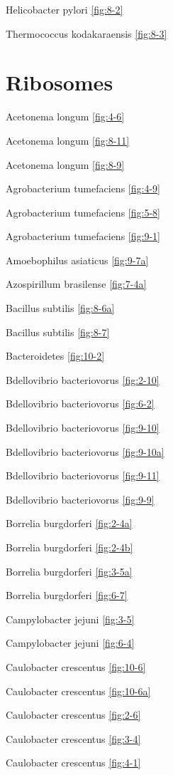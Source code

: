 \documentclass[]{tufte-book}
\begin{document}
Helicobacter pylori \ref{fig:8-2}

Thermococcus kodakaraensis \ref{fig:8-3}

\section*{Ribosomes}\label{ribosomes}

Acetonema longum \ref{fig:4-6}

Acetonema longum \ref{fig:8-11}

Acetonema longum \ref{fig:8-9}

Agrobacterium tumefaciens \ref{fig:4-9}

Agrobacterium tumefaciens \ref{fig:5-8}

Agrobacterium tumefaciens \ref{fig:9-1}

Amoebophilus asiaticus \ref{fig:9-7a}

Azospirillum brasilense \ref{fig:7-4a}

Bacillus subtilis \ref{fig:8-6a}

Bacillus subtilis \ref{fig:8-7}

Bacteroidetes \ref{fig:10-2}

Bdellovibrio bacteriovorus \ref{fig:2-10}

Bdellovibrio bacteriovorus \ref{fig:6-2}

Bdellovibrio bacteriovorus \ref{fig:9-10}

Bdellovibrio bacteriovorus \ref{fig:9-10a}

Bdellovibrio bacteriovorus \ref{fig:9-11}

Bdellovibrio bacteriovorus \ref{fig:9-9}

Borrelia burgdorferi \ref{fig:2-4a}

Borrelia burgdorferi \ref{fig:2-4b}

Borrelia burgdorferi \ref{fig:3-5a}

Borrelia burgdorferi \ref{fig:6-7}

Campylobacter jejuni \ref{fig:3-5}

Campylobacter jejuni \ref{fig:6-4}

Caulobacter crescentus \ref{fig:10-6}

Caulobacter crescentus \ref{fig:10-6a}

Caulobacter crescentus \ref{fig:2-6}

Caulobacter crescentus \ref{fig:3-4}

Caulobacter crescentus \ref{fig:4-1}
\end{document}
